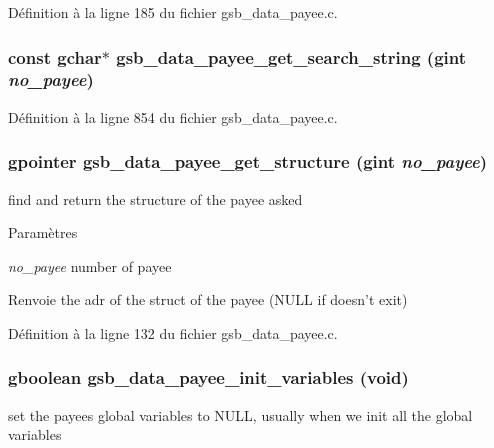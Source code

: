 Définition à la ligne 185 du fichier gsb\_\-data\_\-payee.c.

\subsubsection[{gsb\_\-data\_\-payee\_\-get\_\-search\_\-string}]{\setlength{\rightskip}{0pt plus 5cm}const gchar$\ast$ gsb\_\-data\_\-payee\_\-get\_\-search\_\-string (gint {\em no\_\-payee})}\label{gsb__data__payee_8c_a8162f3417a19a1fff59c24b47c28e891}


Définition à la ligne 854 du fichier gsb\_\-data\_\-payee.c.

\subsubsection[{gsb\_\-data\_\-payee\_\-get\_\-structure}]{\setlength{\rightskip}{0pt plus 5cm}gpointer gsb\_\-data\_\-payee\_\-get\_\-structure (gint {\em no\_\-payee})}\label{gsb__data__payee_8c_a6e682c7bfd8d88b7136512fe2679a24b}
find and return the structure of the payee asked


\begin{DoxyParams}{Paramètres}
\item[{\em no\_\-payee}]number of payee\end{DoxyParams}
\begin{DoxyReturn}{Renvoie}
the adr of the struct of the payee (NULL if doesn't exit) 
\end{DoxyReturn}


Définition à la ligne 132 du fichier gsb\_\-data\_\-payee.c.

\subsubsection[{gsb\_\-data\_\-payee\_\-init\_\-variables}]{\setlength{\rightskip}{0pt plus 5cm}gboolean gsb\_\-data\_\-payee\_\-init\_\-variables (void)}\label{gsb__data__payee_8c_a22dc85bacf731dbdd5abc873db60ae2d}
set the payees global variables to NULL, usually when we init all the global variables


